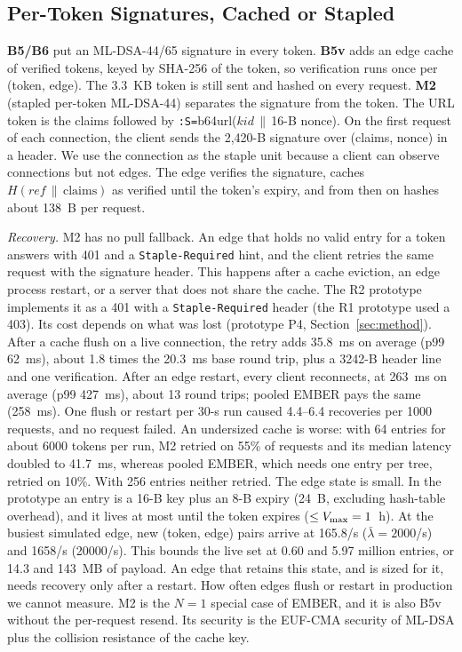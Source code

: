 \subsection{Per-Token Signatures, Cached or Stapled}
\textbf{B5/B6} put an ML-DSA-44/65 signature in every token. \textbf{B5v} adds an edge cache of verified tokens, keyed by SHA-256 of the token, so verification runs once per (token, edge). The 3.3~KB token is still sent and hashed on every request. \textbf{M2} (stapled per-token ML-DSA-44) separates the signature from the token. The URL token is the claims followed by \texttt{:S=}b64url($\mathit{kid}\,\|\,$16-B nonce). On the first request of each connection, the client sends the 2,420-B signature over (claims, nonce) in a header. We use the connection as the staple unit because a client can observe connections but not edges. The edge verifies the signature, caches $H(\mathit{ref}\,\|\,\text{claims})$ as verified until the token's expiry, and from then on hashes about 138~B per request.

\emph{Recovery.} M2 has no pull fallback. An edge that holds no valid entry for a token answers with 401 and a \texttt{Staple-Required} hint, and the client retries the same request with the signature header. This happens after a cache eviction, an edge process restart, or a server that does not share the cache. The R2 prototype implements it as a 401 with a \texttt{Staple-Required} header (the R1 prototype used a 403). Its cost depends on what was lost (prototype P4, Section~\ref{sec:method}). After a cache flush on a live connection, the retry adds 35.8~ms on average (p99 62~ms), about 1.8 times the 20.3~ms base round trip, plus a \num{3242}-B header line and one verification. After an edge restart, every client reconnects, at 263~ms on average (p99 427~ms), about 13 round trips; pooled EMBER pays the same (258~ms). One flush or restart per 30-s run caused 4.4--6.4 recoveries per \num{1000} requests, and no request failed. An undersized cache is worse: with 64 entries for about \num{6000} tokens per run, M2 retried on 55\% of requests and its median latency doubled to 41.7~ms, whereas pooled EMBER, which needs one entry per tree, retried on 10\%. With 256 entries neither retried. The edge state is small. In the prototype an entry is a 16-B key plus an 8-B expiry (24~B, excluding hash-table overhead), and it lives at most until the token expires ($\le V_{\max}=1$~h). At the busiest simulated edge, new (token, edge) pairs arrive at 165.8/s ($\bar\lambda=2000$/s) and \num{1658}/s (\num{20000}/s). This bounds the live set at 0.60 and 5.97 million entries, or 14.3 and 143~MB of payload. An edge that retains this state, and is sized for it, needs recovery only after a restart. How often edges flush or restart in production we cannot measure. M2 is the $N=1$ special case of EMBER, and it is also B5v without the per-request resend. Its security is the EUF-CMA security of ML-DSA plus the collision resistance of the cache key.

